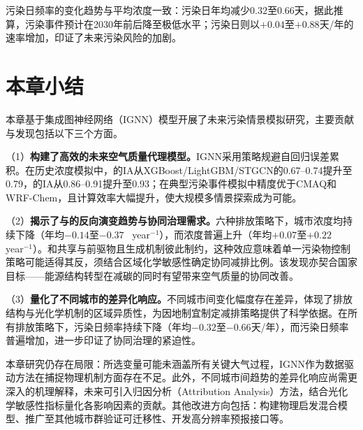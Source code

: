 污染日频率的变化趋势与平均浓度一致：\PM 污染日年均减少$0.32$至$0.66$天，据此推算，\PM 污染事件预计在2030年前后降至极低水平；\ozone 污染日则以$+0.04$至$+0.88$天/年的速率增加，印证了未来\ozone 污染风险的加剧。


\section{本章小结}
\label{sec:sim_summary}

本章基于集成图神经网络（IGNN）模型开展了未来污染情景模拟研究，主要贡献与发现包括以下三个方面。

（1）\textbf{构建了高效的未来空气质量代理模型。}IGNN采用策略规避自回归误差累积。在历史浓度模拟中，\PM 的IA从XGBoost/LightGBM/STGCN的0.67--0.74提升至0.79，\ozone 的IA从0.86--0.91提升至0.93；在典型污染事件模拟中精度优于CMAQ和WRF-Chem，且计算效率大幅提升，使大规模多情景探索成为可能。

（2）\textbf{揭示了\PM 与\ozone 的反向演变趋势与协同治理需求。}六种排放策略下，城市\PM 浓度均持续下降（年均$-0.14$至$-0.37$~\ug{} year$^{-1}$），而\ozone 浓度普遍上升（年均$+0.07$至$+0.22$~\ug{} year$^{-1}$）。\PM 和\ozone 共享\NOx 与\VOCs 前驱物且生成机制彼此制约，这种效应意味着单一污染物控制策略可能适得其反，须结合区域化学敏感性确定协同减排比例。该发现亦契合国家目标——能源结构转型在减碳的同时有望带来空气质量的协同改善。

（3）\textbf{量化了不同城市的差异化响应。}不同城市间\ozone 变化幅度存在差异，体现了排放结构与光化学机制的区域异质性，为因地制宜制定减排策略提供了科学依据。在所有排放策略下，\PM 污染日频率持续下降（年均$-0.32$至$-0.66$天/年），而\ozone 污染日频率普遍增加，进一步印证了协同治理的紧迫性。

本章研究仍存在局限：所选变量可能未涵盖所有关键大气过程，IGNN作为数据驱动方法在捕捉物理机制方面存在不足。此外，不同城市间\ozone 趋势的差异化响应尚需更深入的机理解释，未来可引入归因分析（Attribution Analysis）方法，结合光化学敏感性指标量化各影响因素的贡献。其他改进方向包括：构建物理启发混合模型、推广至其他城市群验证可迁移性、开发高分辨率预报接口等。
